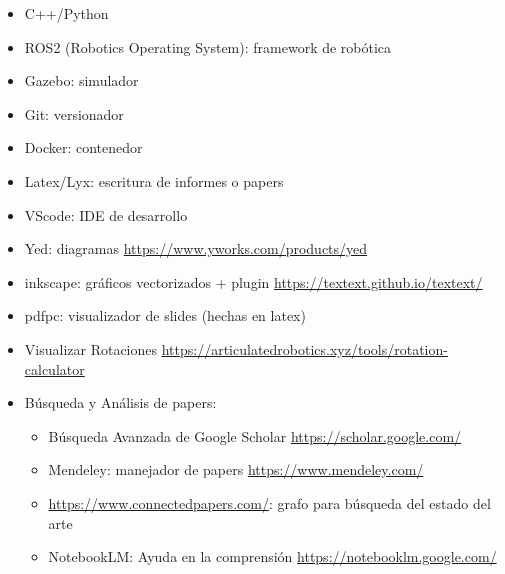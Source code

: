 \documentclass[a4paper,	11pt]{article}
\begin{document}
\begin{itemize}
    \item C++/Python
    \item ROS2 (Robotics Operating System): framework de robótica
    \item Gazebo: simulador
    \item Git: versionador
    \item Docker: contenedor
    \item Latex/Lyx: escritura de informes o papers
    \item VScode: IDE de desarrollo
    \item Yed: diagramas \url{https://www.yworks.com/products/yed}
    \item inkscape: gráficos vectorizados + plugin \url{https://textext.github.io/textext/}
    \item pdfpc: visualizador de slides (hechas en latex)
    \item Visualizar Rotaciones \url{https://articulatedrobotics.xyz/tools/rotation-calculator}
    \item Búsqueda y Análisis de papers:
    \begin{itemize}
        \item Búsqueda Avanzada de Google Scholar \url{https://scholar.google.com/}
        \item Mendeley: manejador de papers \url{https://www.mendeley.com/}
        \item \url{https://www.connectedpapers.com/}: grafo para búsqueda del estado del arte
        \item NotebookLM: Ayuda en la comprensión \url{https://notebooklm.google.com/}
    \end{itemize}
\end{itemize}


\printbibliography
\end{document}

